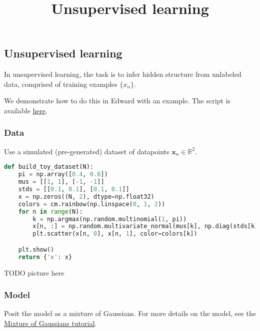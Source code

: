 \title{Unsupervised learning}

\subsection{Unsupervised learning}

In unsupervised learning, the task is to infer hidden structure from
unlabeled data, comprised of training examples $\{x_n\}$.

We demonstrate how to do this in Edward with an example.
The script is available
\href{https://github.com/blei-lab/edward/blob/master/examples/mixture_gaussian.py}
{here}.


\subsubsection{Data}

Use a simulated (pre-generated) dataset of datapoints
$\mathbf{x}_n\in\mathbb{R}^2$.
\begin{lstlisting}[language=Python]
def build_toy_dataset(N):
    pi = np.array([0.4, 0.6])
    mus = [[1, 1], [-1, -1]]
    stds = [[0.1, 0.1], [0.1, 0.1]]
    x = np.zeros((N, 2), dtype=np.float32)
    colors = cm.rainbow(np.linspace(0, 1, 2))
    for n in range(N):
        k = np.argmax(np.random.multinomial(1, pi))
        x[n, :] = np.random.multivariate_normal(mus[k], np.diag(stds[k]))
        plt.scatter(x[n, 0], x[n, 1], color=colors[k])

    plt.show()
    return {'x': x}
\end{lstlisting}
TODO picture here


\subsubsection{Model}

Posit the model as a mixture of Gaussians. For more details on the
model, see the
\href{tut_mixture_gaussian.html}
{Mixture of Gaussians tutorial}.

